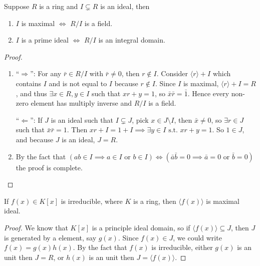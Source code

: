 \begin{prop} \label{prop:max-prime-to-field-int-domain}
  Suppose $R$ is a ring and $I \subsetneq R$ is an ideal, then
  \begin{enumerate}
    \item $I$ is maximal $\iff$ $R / I$ is a field.
    \item $I$ is a prime ideal $\iff$ $R / I$ is an integral domain.
  \end{enumerate}

  \begin{proof} \hfill
    \begin{enumerate}
      \item ``$\Rightarrow$'': For any $\bar{r} \in R/I$ with $\bar{r} \neq 0$, then $r \not\in I$.
        Consider $\langle r \rangle + I$ which contains $I$ and is not equal to $I$ because $r \not\in I$.
        Since $I$ is maximal, $\langle r \rangle + I = R$, and thus $\exists x \in R, y \in I$ such that
        $xr + y = 1$, so $\bar{x} \bar{r} = \bar{1}$. Hence every non-zero element has multiply inverse
        and $R / I$ is a field.

      ``$\Leftarrow$'': If $J$ is an ideal such that $I \subsetneq J$, pick $x \in J \setminus I$,
      then $\bar{x} \neq 0$, so $\exists r \in J$ such that $\bar{x} \bar{r} = 1$. Then
      $xr + I = 1 + I \implies \exists y \in I \text{ s.t. } xr + y = 1$. So $1 \in J$, and
      because $J$ is an ideal, $J = R$.

      \item By the fact that $(ab \in I \implies a \in I \text{ or } b \in I) \iff
        (\bar{a}\bar{b} = 0 \implies \bar{a} = 0 \text{ or } \bar{b} = 0)$ the proof is complete.
    \end{enumerate}
  \end{proof}
\end{prop}

\begin{prop} \label{prop:irr-to-max-ideal}
  If $f(x) \in K[x]$ is irreducible, where $K$ is a ring, then $\langle f(x) \rangle$ is maximal ideal.
  \begin{proof}
    We know that $K[x]$ is a principle ideal domain, so if $\langle f(x) \rangle \subseteq J$, then
    $J$ is generated by a element, say $g(x)$. Since $f(x) \in J$, we could write $f(x) = g(x) h(x)$.
    By the fact that $f(x)$ is irreducible, either $g(x)$ is an unit then $J = R$, or $h(x)$ is
    an unit then $J = \langle f(x) \rangle$.
  \end{proof}
\end{prop}

